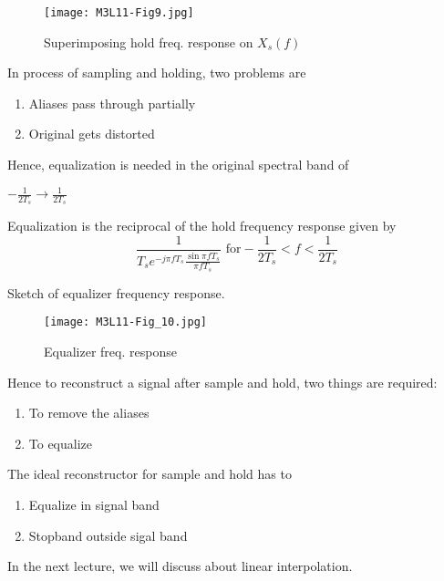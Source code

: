 \begin{figure}[ht]
\centering
\texttt{[image: M3L11-Fig9.jpg]}
\caption{Superimposing hold freq. response on $X_{s}(f)$}
\end{figure}


In process of sampling and holding, two problems are
\begin{enumerate}
\item Aliases pass through partially
\item Original gets distorted
\end{enumerate}


Hence, equalization is needed in the original spectral band of

$-\frac{1}{2T_s} \rightarrow \frac{1}{2T_s}$

Equalization is the reciprocal of the hold frequency response given by\\
{\large
$$\frac{1}{T_s e^{-j \pi f T_s}\frac{\sin \pi fT_s}{\pi f T_s}}
\mbox{  for} -\frac{1}{2T_s} < f <  \frac{1}{2 T_s}$$
}
\newpage

Sketch of equalizer frequency response.

\begin{figure}[ht]
\centering
\texttt{[image: M3L11-Fig\_10.jpg]}
\caption{Equalizer freq. response}
\end{figure}


Hence to reconstruct a signal after sample and hold, two things are required:
\begin{enumerate}
\item To remove the aliases
\item To equalize
\end{enumerate}

The ideal reconstructor for sample and hold has to
\begin{enumerate}
\item Equalize in signal band
\item Stopband outside sigal band
\end{enumerate}

In the next lecture, we will discuss about linear interpolation.

